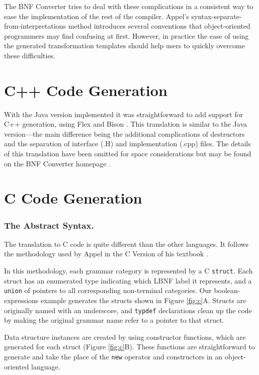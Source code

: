 \documentclass{llncs}
\newcommand{\shortsection}[1]{\subsubsection*{#1.}} %
\begin{document}
The BNF Converter tries to deal with these complications in a consistent way to ease the implementation of the rest of the compiler. Appel's syntax-separate-from-interpretations method introduces several conventions that object-oriented programmers may find confusing at first. However, in practice the ease of using the generated transformation templates should help users to quickly overcome these difficulties.



\section{C++ Code Generation}

With the Java version implemented it was straightforward to add support for C++ generation, using Flex \cite{flex} and Bison \cite{bison}. This translation is similar to the Java version---the main difference being the additional complications of destructors and the separation of interface (.H) and implementation (.cpp) files. The details of this translation have been omitted for space considerations but may be found on the BNF Converter homepage \cite{bnfcsite}.

\section{C Code Generation}

\shortsection{The Abstract Syntax}

The translation to C code is quite different than the other languages. It follows the methodology used by Appel in the C Version of his textbook \cite{AppelC}.

In this methodology, each grammar category is represented by a C \texttt{struct}. Each struct has an enumerated type indicating which LBNF label it represents, and a \texttt{union} of pointers to all corresponding non-terminal categories. Our boolean-expressions example generates the structs shown in Figure \ref{fig:c}A. Structs are originally named with an underscore, and \texttt{typdef} declarations clean up the code by making the original grammar name refer to a pointer to that struct.

Data structure instances are created by using constructor functions, which are generated for each struct (Figure \ref{fig:c}B). These functions are straightforward to generate and take the place of the \texttt{new} operator and constructors in an object-oriented language.
\end{document}
